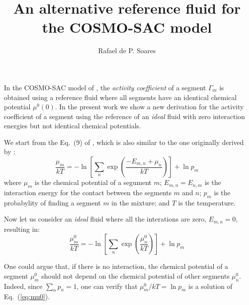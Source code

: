 \documentclass[3p]{elsarticle}
\begin{document}
\begin{frontmatter}
\title{An alternative reference fluid for the COSMO-SAC model}
\author{Rafael de P. Soares}

\address{Departamento de Engenharia Qu\'imica, Escola de
Engenharia, Universidade Federal do Rio Grande do Sul,
Rua Engenheiro Luis Englert, s/n, Bairro Farroupilha, CEP 90040-040, Porto
Alegre, RS, Brazil\\July 2013}


\end{frontmatter}

In the COSMO-SAC \citep{Lin:2002} model of \citeauthor{Lin:2002}, the \emph{activity coefficient} of a
segment $\Gamma_m$ is obtained using a reference fluid where all segments
have an identical chemical potential $\mu^0(0)$.
In the present work we show a new derivation for the activity coefficient of a segment
using the reference of an \emph{ideal} fluid with zero interaction energies but
not identical chemical potentials.

We start from the Eq.~(9) of \cite{Lin:2002}, which is also similar to the one originally derived
by \citeauthor{Klamt:1995}\cite{Klamt:1995}:
\begin{equation}\label{eq:mu}
	\frac{\mu_m}{kT} =-\ln\left[\sum_n
	\exp\left(\frac{-E_{m,n} + \mu_n}{kT}\right)\right] + \ln{p_m}
\end{equation}
where $\mu_m$ is the chemical potential of a segument $m$; $E_{m,n} = E_{n,m}$ is the interaction
energy for the contact between the segments $m$ and $n$; $p_m$ is the
probabylity of finding a segment $m$ in the mixture; and $T$ is the temperature.

Now let us consider an \emph{ideal} fluid where all the interations are zero, $E_{m,n}=0$,
resulting in:
\begin{equation}\label{eq:mu0}
	\frac{\mu_m^0}{kT} =-\ln\left[\sum_n
	\exp\left(\frac{\mu_n^0}{kT}\right)\right] + \ln{p_m}
\end{equation}

One could argue that, if there is no interaction, the chemical potential
of a segment $\mu_m^0$ should not depend on the chemical potential
of other segments $\mu_n^0$.
Indeed, since $\sum_n p_n = 1$, one can verify that $\mu_m^0/kT =
\ln{p_m}$ is a solution of Eq.~(\ref{eq:mu0}).
\end{document}

